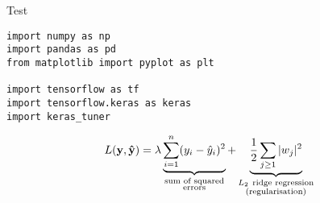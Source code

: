 Test

\begin{verbatim}
import numpy as np
import pandas as pd
from matplotlib import pyplot as plt

import tensorflow as tf
import tensorflow.keras as keras
import keras_tuner
\end{verbatim}

$$ L(\mathbf{y}, \mathbf{\hat{y}}) = \lambda \underbrace{\sum_{i=1}^{n} (y_i - \hat{y}_i)^2}_{\substack{\textup{sum of squared} \\ \textup{errors}}} + \underbrace{ \frac{1}{2} \sum_{j\geq 1}^{} |w_j|^2}_{\substack{L_2 \ \textup{ridge regression} \\ \textup{(regularisation)}}} $$
